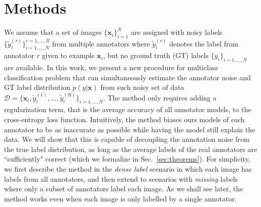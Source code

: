 

\section{Methods}
 
We assume that a set of images $\{\mathbf{x}_i\}_{i=1}^N$ are assigned with noisy labels $\{\tilde{y}^{(r)}_{i}\}^{r=1,...,R}_{i=1,...,N}$ from multiple annotators where $\tilde{y}^{(r)}_{i}$ denotes the label from annotator $r$ given to example $\mathbf{x}_i$, but no ground truth (GT) labels $\{y_{i}\}_{i=1,...,N}$ are available. In this work, we present a new procedure for multiclass classification problem that can simultaneously estimate the annotator noise and GT label distribution $p(y|\mathbf{x})$ from such noisy set of data $\mathcal{D} = \{\textbf{x}_i, \tilde{y}^{(1)}_{i},...,\tilde{y}^{(R)}_{i}\}_{i=1,...,N}$. The method only requires adding a regularization term, that is the average accuracy of all annotator models, to the cross-entropy loss function. Intuitively, the method biases ours models of each annotator to be as inaccurate as possible while having the model still explain the data. We will show that this is capable of decoupling the annotation noise from the true label distribution, as long as the average labels of the real annotators are ``sufficiently" correct (which we formalize in Sec.~\ref{sec:theorems}). For simplicity, we first describe the method in the \textit{dense label} scenario in which each image has labels from all annotators, and then extend to scenarios with \textit{missing} labels where only a subset of annotators label each image. As we shall see later, the method works even when each image is only labelled by a single annotator. 

